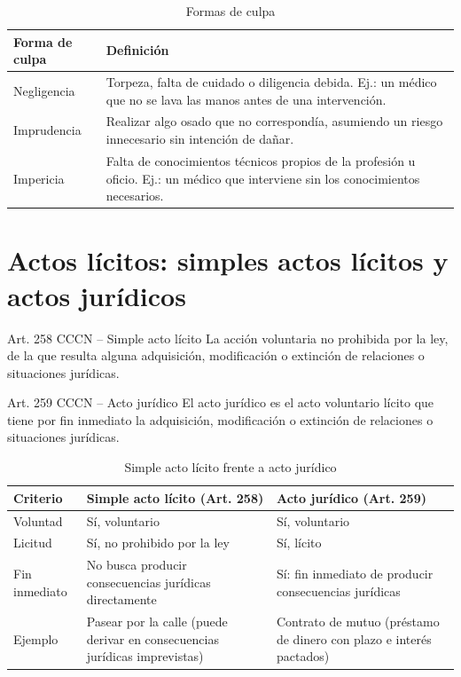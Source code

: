 \documentclass[12pt,oneside]{book}
\begin{document}
\begin{table}[H]
\centering
\caption{Formas de culpa}
\begin{tabularx}{\textwidth}{l X}
\toprule
\textbf{Forma de culpa} & \textbf{Definición} \\
\midrule
Negligencia & Torpeza, falta de cuidado o diligencia debida. Ej.: un médico que no se lava las manos antes de una intervención. \\
Imprudencia & Realizar algo osado que no correspondía, asumiendo un riesgo innecesario sin intención de dañar. \\
Impericia & Falta de conocimientos técnicos propios de la profesión u oficio. Ej.: un médico que interviene sin los conocimientos necesarios. \\
\bottomrule
\end{tabularx}
\end{table}

\section{Actos lícitos: simples actos lícitos y actos jurídicos}

\begin{definition}{Art. 258 CCCN -- Simple acto lícito}
La acción voluntaria no prohibida por la ley, de la que resulta alguna adquisición, modificación o extinción de relaciones o situaciones jurídicas.
\end{definition}

\begin{definition}{Art. 259 CCCN -- Acto jurídico}
El acto jurídico es el acto voluntario lícito que tiene por fin inmediato la adquisición, modificación o extinción de relaciones o situaciones jurídicas.
\end{definition}

\begin{table}[H]
\centering
\caption{Simple acto lícito frente a acto jurídico}
\begin{tabularx}{\textwidth}{l X X}
\toprule
\textbf{Criterio} & \textbf{Simple acto lícito (Art. 258)} & \textbf{Acto jurídico (Art. 259)} \\
\midrule
Voluntad & Sí, voluntario & Sí, voluntario \\
Licitud & Sí, no prohibido por la ley & Sí, lícito \\
Fin inmediato & No busca producir consecuencias jurídicas directamente & Sí: fin inmediato de producir consecuencias jurídicas \\
Ejemplo & Pasear por la calle (puede derivar en consecuencias jurídicas imprevistas) & Contrato de mutuo (préstamo de dinero con plazo e interés pactados) \\
\bottomrule
\end{tabularx}
\end{table}
\end{document}
